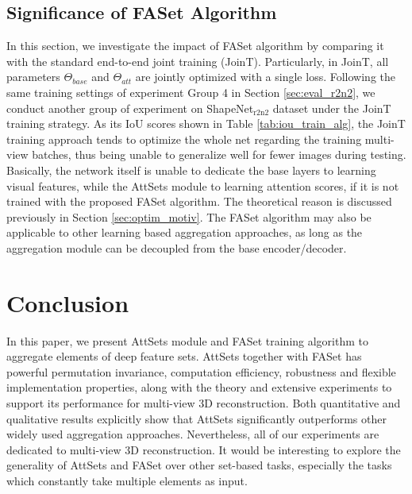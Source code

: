 \documentclass[twocolumn]{svjour3}    \pdfoutput=1
\newcommand{\nickname}{AttSets}
\newcommand{\faset}{FASet}
\newcommand{\rev}{}
\begin{document}
\subsection{Significance of \faset{} Algorithm}\label{sec:sig_faset}
In this section, we investigate the impact of \faset{} algorithm by comparing it with the standard end-to-end joint training (JoinT). Particularly, in JoinT, all parameters $\Theta_{base}$ and $\Theta_{att}$ are jointly optimized with a single loss. Following the same training settings of experiment Group 4 in Section \ref{sec:eval_r2n2}, we conduct another group of experiment on ShapeNet$_{\textrm{r2n2}}$ dataset under the JoinT training strategy. As its IoU scores shown in Table \ref{tab:iou_train_alg}, the JoinT training approach tends to optimize the whole net regarding the training multi-view batches, thus being unable to generalize well for fewer images during testing. Basically, the network itself is unable to dedicate the base layers to learning visual features, while the \nickname{} module to learning attention scores, if it is not trained with the proposed \faset{} algorithm. The theoretical reason is discussed previously in Section \ref{sec:optim_motiv}. \rev{The \faset{} algorithm may also be applicable to other learning based aggregation approaches, as long as the aggregation module can be decoupled from the base encoder/decoder.}

\vspace{-0.4cm}
\section{Conclusion}
In this paper, we present \nickname{} module and \faset{} training algorithm to aggregate elements of deep feature sets. \nickname{} together with \faset{} has powerful permutation invariance, computation efficiency, robustness and flexible implementation properties, along with the theory and extensive experiments to support its performance for multi-view 3D reconstruction. Both quantitative and qualitative results explicitly show that \nickname{} significantly outperforms other widely used aggregation approaches. Nevertheless, all of our experiments are dedicated to multi-view 3D reconstruction. It would be interesting to explore the generality of \nickname{} and \faset{} over other set-based tasks, especially the tasks which constantly take multiple elements as input.

\clearpage
         
\end{document}
